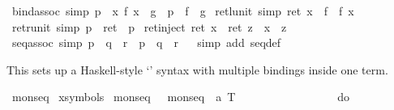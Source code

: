 \begin{isabellebody}
\ bind{\isacharunderscore}assoc\ {\isacharbrackleft}simp{\isacharbrackright}{\isacharcolon}\ {\isachardoublequote}{\isacharparenleft}p\ {\isasymggreater}{\isacharequal}\ {\isacharparenleft}{\isasymlambda}x{\isachardot}\ f\ x\ {\isasymggreater}{\isacharequal}\ g{\isacharparenright}{\isacharparenright}\ {\isacharequal}\ {\isacharparenleft}p\ {\isasymggreater}{\isacharequal}\ f\ {\isasymggreater}{\isacharequal}\ g{\isacharparenright}{\isachardoublequote}\isanewline
\ ret{\isacharunderscore}lunit\ {\isacharbrackleft}simp{\isacharbrackright}{\isacharcolon}\ {\isachardoublequote}{\isacharparenleft}ret\ x\ {\isasymggreater}{\isacharequal}\ f{\isacharparenright}\ {\isacharequal}\ f\ x{\isachardoublequote}\isanewline
\ ret{\isacharunderscore}runit\ {\isacharbrackleft}simp{\isacharbrackright}{\isacharcolon}\ {\isachardoublequote}{\isacharparenleft}p\ {\isasymggreater}{\isacharequal}\ ret{\isacharparenright}\ {\isacharequal}\ p{\isachardoublequote}\isanewline
\ ret{\isacharunderscore}inject{\isacharcolon}\ {\isachardoublequote}ret\ x\ {\isacharequal}\ ret\ z\ {\isasymLongrightarrow}\ x\ {\isacharequal}\ z{\isachardoublequote}\isanewline
\isanewline
\isamarkupfalse%
\ seq{\isacharunderscore}assoc\ {\isacharbrackleft}simp{\isacharbrackright}{\isacharcolon}\ {\isachardoublequote}{\isacharparenleft}p\ {\isasymggreater}\ {\isacharparenleft}q\ {\isasymggreater}\ r{\isacharparenright}{\isacharparenright}\ {\isacharequal}\ {\isacharparenleft}p\ {\isasymggreater}\ q\ {\isasymggreater}\ r{\isacharparenright}{\isachardoublequote}\isanewline
\ \isamarkupfalse%
\ {\isacharparenleft}simp\ add{\isacharcolon}\ seq{\isacharunderscore}def{\isacharparenright}\isamarkupfalse%
%
\begin{isamarkuptext}%
This sets up a Haskell-style `' syntax 
  with multiple bindings inside one  term.
  \label{isa:do-notation}%
\end{isamarkuptext}%
\isamarkuptrue%
\isanewline
\ monseq\isanewline
\isanewline
\isamarkupfalse%
\ {\isacharparenleft}xsymbols{\isacharparenright}\isanewline
\ {\isachardoublequote}{\isacharunderscore}monseq{\isachardoublequote}\ \ {\isacharcolon}{\isacharcolon}\ {\isachardoublequote}monseq\ {\isasymRightarrow}\ {\isacharprime}a\ T{\isachardoublequote}\ \ \ \ \ \ \ \ \ \ \ \ \ \ \ \ \ \ {\isacharparenleft}{\isachardoublequote}{\isacharparenleft}do\ {\isacharbraceleft}{\isacharparenleft}{\isacharunderscore}{\isacharparenright}{\isacharbraceright}{\isacharparenright}{\isachardoublequote}\ \ \ \ {\isacharbrackleft}{}{\isacharbrackright}\ {}{}{}{\isacharparenright}\isanewline

\end{isabellebody}
